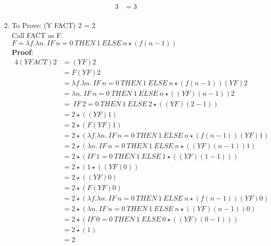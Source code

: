 \documentclass[11pt]{article}
\begin{document}
\begin{enumerate}
\begin{enumerate}
\begin{alignat*}{3}
                    &= 3\\
            \end{alignat*}
    \item To Prove: (Y FACT) 2 = 2\\
    Call FACT as F.\\ $F= \lambda f. \lambda n.\:IF\:n = 0\:THEN\:1\:ELSE\:n\star
(f (n-1))$\\
          \textbf{Proof}:  \begin{alignat*}{4}
                (Y FACT) 2  &=(Y F) 2\\
                &= F (Y F) 2 \\
                &= \lambda f. \lambda n.\:IF\:n =0\:THEN\:1\:ELSE\:n\star(f(n-1)) (Y F) 2\\
        &= \lambda n.\:IF\:n = 0\:THEN\:1\:ELSE\:n\star((YF)(n-1)) 2 \\
        &= \:IF\:2 = 0\:THEN\:1\:ELSE\:2\star ((YF)(2-1))\\
        &= 2\star((YF)1)\\
        &= 2\star(F (YF)1)\\
        &= 2\star( \lambda f. \lambda n.\:IF\:n =0\:THEN\:1\:ELSE\:n\star(f(n-1)) (Y F) 1 )\\
        &= 2\star( \lambda n.\:IF\:n =0\:THEN\:1\:ELSE\:n\star((Y F)(n-1))  1 )\\
        &= 2\star( IF\:1 =0\:THEN\:1\:ELSE\:1\star((Y F)(1-1)) )\\
        &= 2\star(1\star ( (YF) 0  )   )\\
        &= 2\star( (YF) 0)\\
        &= 2\star( F(YF) 0)\\
        &= 2\star( \lambda f. \lambda n.\:IF\:n =0\:THEN\:1\:ELSE\:n\star(f(n-1)) (Y F) 0 )\\
        &=  2\star( \lambda n.\:IF\:n =0\:THEN\:1\:ELSE\:n\star((Y F)(n-1))  0)\\
        &= 2\star( IF\:0 =0\:THEN\:1\:ELSE\:0\star((Y F)(0-1)) )\\
        &= 2\star(1) \\
                    &= 2\\
            \end{alignat*}


\end{enumerate}
\end{enumerate}
\end{document}
